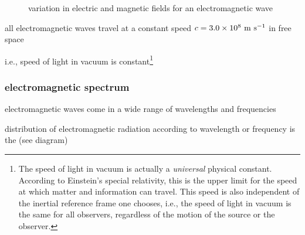 \begin{figure}[ht]
	\caption*{variation in electric and magnetic fields for an electromagnetic wave}
\end{figure}

	
\cmt all electromagnetic waves travel at a constant speed $c=3.0\times10^8\text{ m s$^{-1}$}$ in free space

i.e., speed of light in vacuum is constant\footnote{The speed of light in vacuum is actually a \emph{universal} physical constant. According to Einstein's special relativity, this is the upper limit for the speed at which matter and information can travel. This speed is also independent of the inertial reference frame one chooses, i.e., the speed of light in vacuum is the same for all observers, regardless of the motion of the source or the observer.}



\subsubsection{electromagnetic spectrum}

electromagnetic waves come in a wide range of wavelengths and frequencies 

distribution of electromagnetic radiation according to wavelength or frequency is the  (see diagram)



